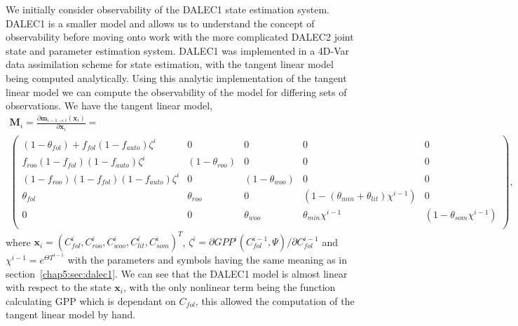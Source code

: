 We initially consider observability of the DALEC1 state estimation system. DALEC1 is a smaller model and allows us to understand the concept of observability before moving onto work with the more complicated DALEC2 joint state and parameter estimation system. DALEC1 was implemented in a 4D-Var data assimilation scheme for state estimation, with the tangent linear model being computed analytically. Using this analytic implementation of the tangent linear model we can compute the observability of the model for differing sets of observations. We have the tangent linear model,
\begin{multline}
\mathbf{M}_{i} = \frac{\partial \textbf{m}_{i-1\rightarrow i}(\textbf{x}_{i})}{\partial \textbf{x}_{i}} = 
\\ \begin{pmatrix}  
(1-\theta_{fol})+f_{fol}(1-f_{auto})\zeta^i & 0 & 0 & 0 & 0 \\
f_{roo}(1-f_{fol})(1-f_{auto})\zeta^i & (1-\theta_{roo}) & 0 & 0 & 0 \\
(1-f_{roo})(1-f_{fol})(1-f_{auto})\zeta^i & 0 & (1-\theta_{woo}) & 0 & 0 \\
\theta_{fol} & \theta_{roo} & 0 & (1-(\theta_{min}+\theta_{lit})\chi^{i-1}) & 0 \\
0 & 0 & \theta_{woo} & \theta_{min}\chi^{i-1} & (1-\theta_{som}\chi^{i-1}) \\
\end{pmatrix}, \label{chap5:eqn:linmod}
\end{multline}
where \(\textbf{x}_{i}=(C_{fol}^{i}, C_{roo}^{i}, C_{woo}^{i}, C_{lit}^{i}, C_{som}^{i})^{T}\), \(\zeta^i = \partial GPP^{i}(C_{fol}^{i-1}, \Psi)/\partial C_{fol}^{i-1}\) and \(\chi^{i-1}=e^{\Theta T^{i-1}}\) with the parameters and symbols having the same meaning as in section~\ref{chap5:sec:dalec1}. We can see that the DALEC1 model is almost linear with respect to the state \(\textbf{x}_{i}\), with the only nonlinear term being the function calculating GPP which is dependant on \(C_{fol}\), this allowed the computation of the tangent linear model by hand. 


